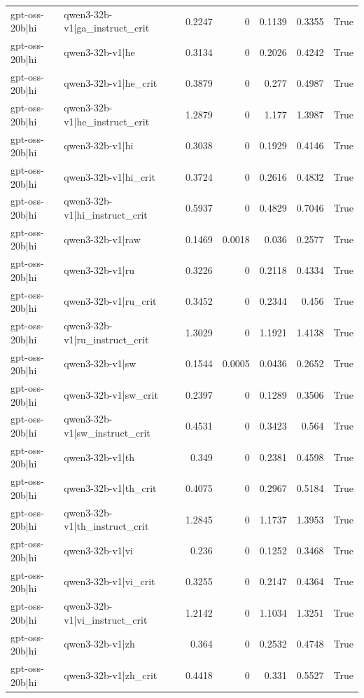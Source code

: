 \begin{table}
\begin{tabular}{l l r r r r l}
gpt-oss-20b|hi & qwen3-32b-v1|ga_instruct_crit & 0.2247 & 0 & 0.1139 & 0.3355 & True \\
gpt-oss-20b|hi & qwen3-32b-v1|he & 0.3134 & 0 & 0.2026 & 0.4242 & True \\
gpt-oss-20b|hi & qwen3-32b-v1|he_crit & 0.3879 & 0 & 0.277 & 0.4987 & True \\
gpt-oss-20b|hi & qwen3-32b-v1|he_instruct_crit & 1.2879 & 0 & 1.177 & 1.3987 & True \\
gpt-oss-20b|hi & qwen3-32b-v1|hi & 0.3038 & 0 & 0.1929 & 0.4146 & True \\
gpt-oss-20b|hi & qwen3-32b-v1|hi_crit & 0.3724 & 0 & 0.2616 & 0.4832 & True \\
gpt-oss-20b|hi & qwen3-32b-v1|hi_instruct_crit & 0.5937 & 0 & 0.4829 & 0.7046 & True \\
gpt-oss-20b|hi & qwen3-32b-v1|raw & 0.1469 & 0.0018 & 0.036 & 0.2577 & True \\
gpt-oss-20b|hi & qwen3-32b-v1|ru & 0.3226 & 0 & 0.2118 & 0.4334 & True \\
gpt-oss-20b|hi & qwen3-32b-v1|ru_crit & 0.3452 & 0 & 0.2344 & 0.456 & True \\
gpt-oss-20b|hi & qwen3-32b-v1|ru_instruct_crit & 1.3029 & 0 & 1.1921 & 1.4138 & True \\
gpt-oss-20b|hi & qwen3-32b-v1|sw & 0.1544 & 0.0005 & 0.0436 & 0.2652 & True \\
gpt-oss-20b|hi & qwen3-32b-v1|sw_crit & 0.2397 & 0 & 0.1289 & 0.3506 & True \\
gpt-oss-20b|hi & qwen3-32b-v1|sw_instruct_crit & 0.4531 & 0 & 0.3423 & 0.564 & True \\
gpt-oss-20b|hi & qwen3-32b-v1|th & 0.349 & 0 & 0.2381 & 0.4598 & True \\
gpt-oss-20b|hi & qwen3-32b-v1|th_crit & 0.4075 & 0 & 0.2967 & 0.5184 & True \\
gpt-oss-20b|hi & qwen3-32b-v1|th_instruct_crit & 1.2845 & 0 & 1.1737 & 1.3953 & True \\
gpt-oss-20b|hi & qwen3-32b-v1|vi & 0.236 & 0 & 0.1252 & 0.3468 & True \\
gpt-oss-20b|hi & qwen3-32b-v1|vi_crit & 0.3255 & 0 & 0.2147 & 0.4364 & True \\
gpt-oss-20b|hi & qwen3-32b-v1|vi_instruct_crit & 1.2142 & 0 & 1.1034 & 1.3251 & True \\
gpt-oss-20b|hi & qwen3-32b-v1|zh & 0.364 & 0 & 0.2532 & 0.4748 & True \\
gpt-oss-20b|hi & qwen3-32b-v1|zh_crit & 0.4418 & 0 & 0.331 & 0.5527 & True \\

\end{tabular}
\end{table}
